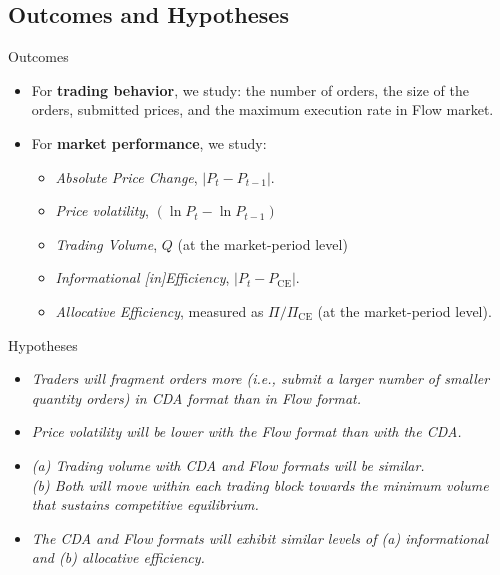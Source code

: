 \documentclass[10pt]{beamer}
\begin{document}
\subsection{Outcomes and Hypotheses}
\begin{frame}{Outcomes}
    \begin{itemize}
        \item For \textbf{trading behavior}, we study: 
     the number of orders, the size of the orders, submitted prices, and
     the maximum execution rate in Flow market. %
        \item For \textbf{market performance}, we study:
        \begin{itemize}
        \item \textit{Absolute Price Change}, $|P_t - P_{t-1}|$. 
        \item \textit{Price volatility}, $(\ln P_t - \ln P_{t-1})$ 
         \item \textit{Trading Volume}, $Q$ (at the market-period level)
\item\textit{Informational [in]Efficiency},  \( |P_t - P_{\text{CE}}| \). 
    \item\textit{Allocative Efficiency}, measured as \( \Pi/\Pi_{\text{CE}}\) (at the market-period level). 
        \end{itemize}
     
    \end{itemize}
\end{frame}

\begin{frame}{Hypotheses}
    \begin{itemize}
        \item[H1] \textit{Traders will fragment orders more
(i.e., submit a larger number of smaller quantity orders) in CDA format than in Flow format.} %
\vspace{0.3cm}
        \item[H2] \textit{Price volatility will be lower with the Flow format than with the CDA.}%
\vspace{0.3cm}        
        \item[H3] \textit{(a) Trading volume with CDA and Flow formats will be similar. \\ (b) Both will move within each trading block towards the minimum volume that sustains competitive equilibrium.} %
\vspace{0.3cm}        
        \item[H4] \textit{The CDA and Flow formats will exhibit similar levels of (a) informational and (b) allocative efficiency.} %
    \end{itemize}
\end{frame}
\end{document}
